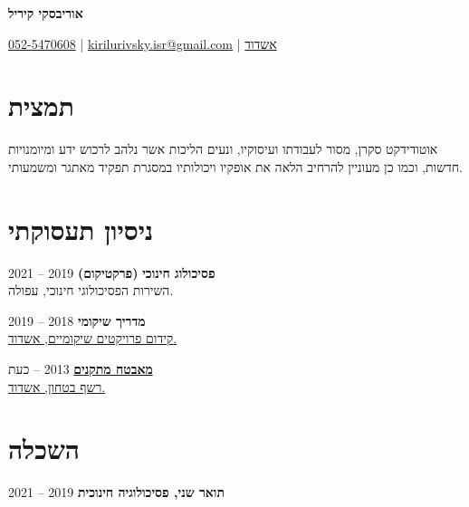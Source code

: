 \documentclass[
	12pt,a4paper %
]{article}
\begin{document}
\setRTL
\begin{hebrew}

\begin{center}
	{\Huge{\textbf{אוריבסקי קיריל}}}
	
	
\vspace{2pt}
\colorbox{shade}{ %
	\href{tel:972525470608}{052-5470608} \raisebox{-1pt}{\faPhone} |  \href{mailto:kirilurivsky.isr@gmail.com}{kirilurivsky.isr@gmail.com} \raisebox{0pt}{\small\faEnvelope} | \href{https://goo.gl/maps/MSacjpSy7vZSKykP7}{אשדוד} \raisebox{0pt}{\faHome}
}
\end{center}
	\section{תמצית}
	אוטודידקט סקרן, מסור לעבודתו ועיסוקיו, ונעים הליכות אשר נלהב לרכוש ידע ומיומנויות חדשות, וכמו כן מעוניין להרחיב הלאה את אופקיו ויכולותיו במסגרת תפקיד מאתגר ומשמעותי.
	\section{ניסיון תעסוקתי}

	\textbf{\large פסיכולוג חינוכי} \textbf{(פרקטיקום)} \hfill 2019 -- 2021 \\
	{השירות הפסיכולוגי חינוכי, עפולה.}

	\noindent\dotfill %

	\noindent\textbf{\large מדריך שיקומי} \hfill 2018 -- 2019 \\
	\href{http://www.kidumpro.co.il/}{ קידום פרויקטים שיקומיים, אשדוד.}

	\noindent\dotfill %

	\noindent\href{https://loona-il.000webhostapp.com/resume-references/recommendation-letter-security-guard.jpg}{\large \textbf{מאבטח מתקנים}} \hfill 2013 -- כעת \\
	\href{https://loona-il.000webhostapp.com/resume-references/recommendation-letter-security-guard.jpg}{רשף בטחון, אשדוד.}

	\section{השכלה}

	\textbf{\large תואר שני, פסיכולוגיה חינוכית} \hfill 2019 -- 2021


\end{hebrew}
\end{document}
